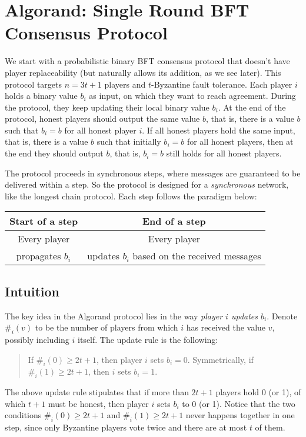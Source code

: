 \documentclass{article}
\begin{document}
\section*{Algorand: Single Round BFT Consensus Protocol}
We start with a probabilistic binary BFT consensus protocol that doesn't have player replaceability (but naturally allows its  addition, as we see later).  This protocol targets $n=3t+1$ players and $t$-Byzantine fault tolerance.  Each player $i$ holds a binary value $b_i$ as input, on which they want to reach agreement. During the protocol, they keep updating their local binary value $b_i$.  
 At the end of the protocol, honest players should output the same value $b$, that is, there is a value $b$ such that $b_i=b$ for all honest player $i$. If all honest players hold the same input, that is, there is a value $b$ such that initially $b_i = b$ for all honest players, then at the end they should output $b$, that is, $b_i = b$ still holds for all honest players.%


The protocol proceeds in synchronous steps, where messages are guaranteed to be delivered within a step. So the protocol is designed for a {\em synchronous} network, like the longest chain protocol. Each step follows the  paradigm below:

\begin{center}
\begin{tabular}{|c|c|}
\hline
    Start of a step & End of a step \\
\hline
Every player & Every player\\
    propagates $b_i$ & updates $b_i$ based on the received messages\\
\hline
\end{tabular}
\end{center}

\subsection*{Intuition} 

The key idea in the Algorand protocol lies in the way  \emph{player $i$ updates $b_i$}. 
Denote $\#_i(v)$ to be  the number of players from which $i$ has received the value $v$,  possibly including $i$ itself.  The  update rule is the following: 
\begin{quote}
    If $\#_i(0)\ge 2t+1$, then player $i$ sets $b_i=0$. Symmetrically, if $\#_i(1)\ge 2t+1$, then $i$ sets $b_i=1$.
\end{quote}
The above update rule stipulates that if more than $2t+1$ players hold 0 (or 1), of which $t+1$ must be honest, then player $i$ sets $b_i$ to 0 (or 1). Notice that the two conditions  $\#_i(0)\ge 2t+1$ and  $\#_i(1)\ge 2t+1$ never happens together in one step, since only Byzantine players vote twice and  there are at most $t$ of them.
\end{document}

